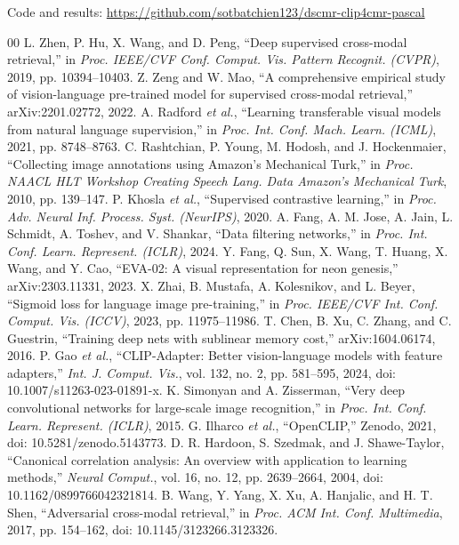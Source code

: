 \documentclass[conference]{IEEEtran}
\begin{document}
Code and results: \url{https://github.com/sotbatchien123/dscmr-clip4cmr-pascal}

\begin{thebibliography}{00}
 L. Zhen, P. Hu, X. Wang, and D. Peng, ``Deep supervised cross-modal retrieval,'' in \textit{Proc. IEEE/CVF Conf. Comput. Vis. Pattern Recognit. (CVPR)}, 2019, pp. 10394--10403.
 Z. Zeng and W. Mao, ``A comprehensive empirical study of vision-language pre-trained model for supervised cross-modal retrieval,'' arXiv:2201.02772, 2022.
 A. Radford \textit{et al.}, ``Learning transferable visual models from natural language supervision,'' in \textit{Proc. Int. Conf. Mach. Learn. (ICML)}, 2021, pp. 8748--8763.
 C. Rashtchian, P. Young, M. Hodosh, and J. Hockenmaier, ``Collecting image annotations using Amazon's Mechanical Turk,'' in \textit{Proc. NAACL HLT Workshop Creating Speech Lang. Data Amazon's Mechanical Turk}, 2010, pp. 139--147.
 P. Khosla \textit{et al.}, ``Supervised contrastive learning,'' in \textit{Proc. Adv. Neural Inf. Process. Syst. (NeurIPS)}, 2020.
 A. Fang, A. M. Jose, A. Jain, L. Schmidt, A. Toshev, and V. Shankar, ``Data filtering networks,'' in \textit{Proc. Int. Conf. Learn. Represent. (ICLR)}, 2024.
 Y. Fang, Q. Sun, X. Wang, T. Huang, X. Wang, and Y. Cao, ``EVA-02: A visual representation for neon genesis,'' arXiv:2303.11331, 2023.
 X. Zhai, B. Mustafa, A. Kolesnikov, and L. Beyer, ``Sigmoid loss for language image pre-training,'' in \textit{Proc. IEEE/CVF Int. Conf. Comput. Vis. (ICCV)}, 2023, pp. 11975--11986.
 T. Chen, B. Xu, C. Zhang, and C. Guestrin, ``Training deep nets with sublinear memory cost,'' arXiv:1604.06174, 2016.
 P. Gao \textit{et al.}, ``CLIP-Adapter: Better vision-language models with feature adapters,'' \textit{Int. J. Comput. Vis.}, vol. 132, no. 2, pp. 581--595, 2024, doi: 10.1007/s11263-023-01891-x.
 K. Simonyan and A. Zisserman, ``Very deep convolutional networks for large-scale image recognition,'' in \textit{Proc. Int. Conf. Learn. Represent. (ICLR)}, 2015.
 G. Ilharco \textit{et al.}, ``OpenCLIP,'' Zenodo, 2021, doi: 10.5281/zenodo.5143773.
 D. R. Hardoon, S. Szedmak, and J. Shawe-Taylor, ``Canonical correlation analysis: An overview with application to learning methods,'' \textit{Neural Comput.}, vol. 16, no. 12, pp. 2639--2664, 2004, doi: 10.1162/0899766042321814.
 B. Wang, Y. Yang, X. Xu, A. Hanjalic, and H. T. Shen, ``Adversarial cross-modal retrieval,'' in \textit{Proc. ACM Int. Conf. Multimedia}, 2017, pp. 154--162, doi: 10.1145/3123266.3123326.
\end{thebibliography}
\end{document}
